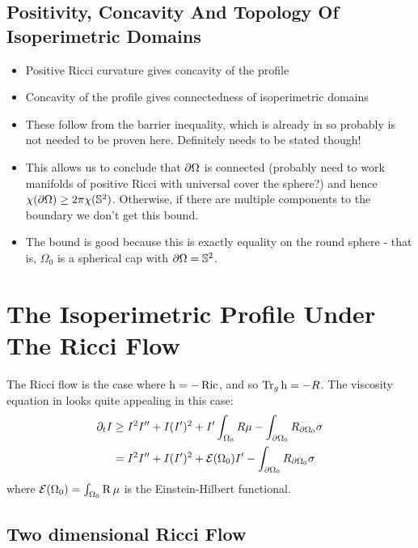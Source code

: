 \documentclass{amsart}
\begin{document}
\subsection{Positivity, Concavity And Topology Of Isoperimetric Domains}

\begin{itemize}
\item Positive Ricci curvature gives concavity of the profile
\item Concavity of the profile gives connectedness of isoperimetric domains
\item These follow from the barrier inequality, which is already in \cite{MR875084} so probably is not needed to be proven here. Definitely needs to be stated though!
\item This allows us to conclude that \(\partial {\Omega}\) is connected (probably need to work manifolds of positive Ricci with universal cover the sphere?) and hence \(\chi(\partial {\Omega}) \geq 2\pi \chi(\mathbb{S}^2)\). Otherwise, if there are multiple components to the boundary we don't get this bound.
\item The bound is good because this is exactly equality on the round sphere - that is, \(\Omega_0\) is a spherical cap with \(\partial {\Omega} = \mathbb{S}^2\).
\end{itemize}

\section{The Isoperimetric Profile Under The Ricci Flow}
\label{subsec:flows_ricci}

The Ricci flow is the case where $\operatorname{h} = -\operatorname{Ric}$, and so $\operatorname{Tr}_g \operatorname{h} = -R$. The viscosity equation in  looks quite appealing in this case:
\begin{equation}
\label{eq:viscosity_ricciflow}
\begin{split}
\partial_t I &\geq I^2I'' + I(I')^2 + I'\int_{\Omega_0} R \mu - \int_{\partial {\Omega_0}} R_{\partial {\Omega_0}}\sigma \\
&= I^2I'' + I(I')^2 + \operatorname{\mathcal{E}}(\Omega_0) I' - \int_{\partial {\Omega_0}} R_{\partial {\Omega_0}}\sigma
\end{split}
\end{equation}
where \(\operatorname{\mathcal{E}}({\Omega_0}) = \int_{\Omega_0} \operatorname{R} \mu\) is the Einstein-Hilbert functional.

\subsection*{Two dimensional Ricci Flow}
\end{document}
